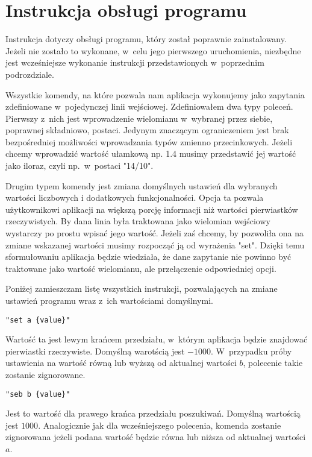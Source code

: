 \section{Instrukcja obsługi programu}

Instrukcja dotyczy obsługi programu, który został poprawnie zainstalowany. Jeżeli nie zostało to wykonane, w~celu jego pierwszego uruchomienia, niezbędne jest wcześniejsze wykonanie instrukcji przedstawionych w~poprzednim podrozdziale.

Wszystkie komendy, na które pozwala nam aplikacja wykonujemy jako zapytania zdefiniowane w~pojedynczej linii wejściowej. Zdefiniowałem dwa typy poleceń. Pierwszy z~nich jest wprowadzenie wielomianu w~wybranej przez siebie, poprawnej składniowo, postaci. Jedynym znaczącym ograniczeniem jest brak bezpośredniej możliwości wprowadzania typów zmienno przecinkowych. Jeżeli chcemy wprowadzić wartość ułamkową np. 1.4 musimy przedstawić jej wartość jako iloraz, czyli np.\ w~postaci "14/10".

Drugim typem komendy jest zmiana domyślnych ustawień dla wybranych wartości liczbowych i dodatkowych funkcjonalności. Opcja ta pozwala użytkownikowi aplikacji na większą porcję informacji niż wartości pierwiastków rzeczywistych. By dana linia była traktowana jako wielomian wejściowy wystarczy po prostu wpisać jego wartość. Jeżeli zaś chcemy, by pozwoliła ona na zmiane wskazanej wartości musimy rozpocząć ją od wyrażenia "set". Dzięki temu sformułowaniu aplikacja będzie wiedziała, że dane zapytanie nie powinno być traktowane jako wartość wielomianu, ale przełączenie odpowiedniej opcji.

Poniżej zamieszczam listę wszystkich instrukcji, pozwalających na zmiane ustawień programu wraz z~ich wartościami domyślnymi.

\begin{lstlisting}
"set a {value}"
\end{lstlisting}

Wartość ta jest lewym krańcem przedziału, w~którym aplikacja będzie znajdować pierwiastki rzeczywiste. Domyślną warotścią jest $-1000$. W~przypadku próby ustawienia na wartość równą lub wyższą od aktualnej wartości $b$, polecenie takie zostanie zignorowane.

\begin{lstlisting}
"seb b {value}"
\end{lstlisting}

Jest to wartość dla prawego krańca przedziału poszukiwań. Domyślną wartością jest $1000$. Analogicznie jak dla wcześniejszego polecenia, komenda zostanie zignorowana jeżeli podana wartość będzie równa lub niższa od aktualnej wartości $a$.

